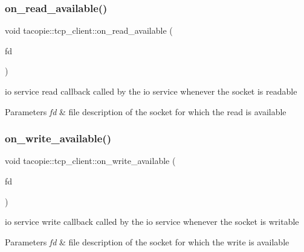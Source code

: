 \subsubsection{\texorpdfstring{on\+\_\+read\+\_\+available()}{on\_read\_available()}}
{\footnotesize\ttfamily void tacopie\+::tcp\+\_\+client\+::on\+\_\+read\+\_\+available (\begin{DoxyParamCaption}\item[{\hyperlink{namespacetacopie_acce7ad26b2d30156b1e6fa353f727026}{fd\+\_\+t}}]{fd }\end{DoxyParamCaption})\hspace{0.3cm}{\ttfamily [private]}}

io service read callback called by the io service whenever the socket is readable


\begin{DoxyParams}{Parameters}
{\em fd} & file description of the socket for which the read is available \\
\hline
\end{DoxyParams}
\mbox{\label{classtacopie_1_1tcp__client_aee290ddef8906d49edf3bdc9e3555d0a}} 
\subsubsection{\texorpdfstring{on\+\_\+write\+\_\+available()}{on\_write\_available()}}
{\footnotesize\ttfamily void tacopie\+::tcp\+\_\+client\+::on\+\_\+write\+\_\+available (\begin{DoxyParamCaption}\item[{\hyperlink{namespacetacopie_acce7ad26b2d30156b1e6fa353f727026}{fd\+\_\+t}}]{fd }\end{DoxyParamCaption})\hspace{0.3cm}{\ttfamily [private]}}

io service write callback called by the io service whenever the socket is writable


\begin{DoxyParams}{Parameters}
{\em fd} & file description of the socket for which the write is available \\
\hline
\end{DoxyParams}
\mbox{\label{classtacopie_1_1tcp__client_af352b6b1e939c919aec2761517051eb9}} 
